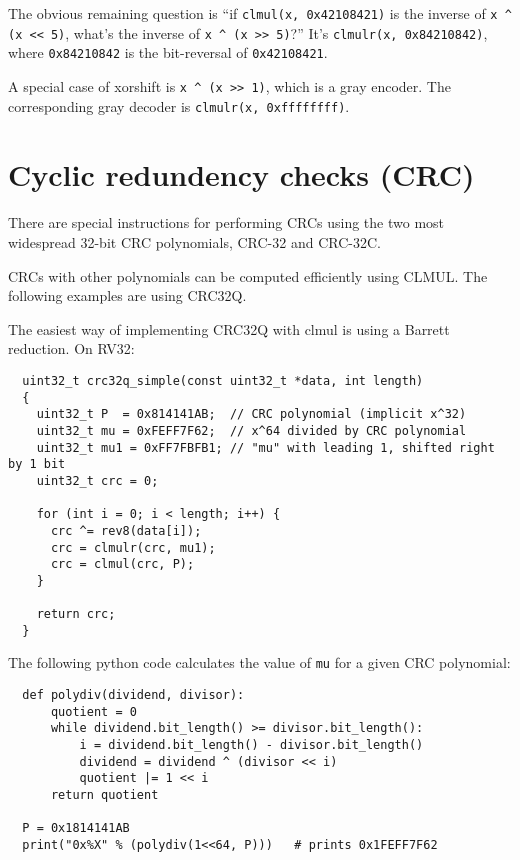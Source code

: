 The obvious remaining question is ``if {\tt clmul(x, 0x42108421)} is the inverse of {\tt x \^{} (x << 5)}, what's
the inverse of {\tt x \^{} (x >> 5)}?'' It's {\tt clmulr(x, 0x84210842)}, where {\tt 0x84210842} is the bit-reversal of {\tt 0x42108421}.

A special case of xorshift is {\tt x \^{} (x >> 1)}, which is a gray encoder. The corresponding gray decoder is {\tt clmulr(x, 0xffffffff)}.


\section{Cyclic redundency checks (CRC)}

There are special instructions for performing CRCs using the two most
widespread 32-bit CRC polynomials, CRC-32 and CRC-32C.

CRCs with other polynomials can be computed efficiently using CLMUL.
The following examples are using CRC32Q.

The easiest way of implementing CRC32Q with clmul is using a Barrett reduction.
On RV32:

\begin{minipage}{\linewidth}
\begin{verbatim}
  uint32_t crc32q_simple(const uint32_t *data, int length)
  {
    uint32_t P  = 0x814141AB;  // CRC polynomial (implicit x^32)
    uint32_t mu = 0xFEFF7F62;  // x^64 divided by CRC polynomial
    uint32_t mu1 = 0xFF7FBFB1; // "mu" with leading 1, shifted right by 1 bit
    uint32_t crc = 0;

    for (int i = 0; i < length; i++) {
      crc ^= rev8(data[i]);
      crc = clmulr(crc, mu1);
      crc = clmul(crc, P);
    }

    return crc;
  }
\end{verbatim}
\end{minipage}

The following python code calculates the value of {\tt mu} for a given CRC
polynomial:

\begin{minipage}{\linewidth}
\begin{verbatim}
  def polydiv(dividend, divisor):
      quotient = 0
      while dividend.bit_length() >= divisor.bit_length():
          i = dividend.bit_length() - divisor.bit_length()
          dividend = dividend ^ (divisor << i)
          quotient |= 1 << i
      return quotient

  P = 0x1814141AB
  print("0x%X" % (polydiv(1<<64, P)))   # prints 0x1FEFF7F62
\end{verbatim}
\end{minipage}

